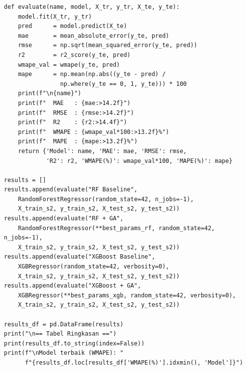 \begin{lstlisting}[style=pycode,caption={Fungsi evaluasi dan perbandingan 4 model}]
def evaluate(name, model, X_tr, y_tr, X_te, y_te):
    model.fit(X_tr, y_tr)
    pred      = model.predict(X_te)
    mae       = mean_absolute_error(y_te, pred)
    rmse      = np.sqrt(mean_squared_error(y_te, pred))
    r2        = r2_score(y_te, pred)
    wmape_val = wmape(y_te, pred)
    mape      = np.mean(np.abs((y_te - pred) /
                np.where(y_te == 0, 1, y_te))) * 100
    print(f"\n{name}")
    print(f"  MAE   : {mae:>14.2f}")
    print(f"  RMSE  : {rmse:>14.2f}")
    print(f"  R2    : {r2:>14.4f}")
    print(f"  WMAPE : {wmape_val*100:>13.2f}%")
    print(f"  MAPE  : {mape:>13.2f}%")
    return {'Model': name, 'MAE': mae, 'RMSE': rmse,
            'R2': r2, 'WMAPE(%)': wmape_val*100, 'MAPE(%)': mape}

results = []
results.append(evaluate("RF Baseline",
    RandomForestRegressor(random_state=42, n_jobs=-1),
    X_train_s2, y_train_s2, X_test_s2, y_test_s2))
results.append(evaluate("RF + GA",
    RandomForestRegressor(**best_params_rf, random_state=42, n_jobs=-1),
    X_train_s2, y_train_s2, X_test_s2, y_test_s2))
results.append(evaluate("XGBoost Baseline",
    XGBRegressor(random_state=42, verbosity=0),
    X_train_s2, y_train_s2, X_test_s2, y_test_s2))
results.append(evaluate("XGBoost + GA",
    XGBRegressor(**best_params_xgb, random_state=42, verbosity=0),
    X_train_s2, y_train_s2, X_test_s2, y_test_s2))

results_df = pd.DataFrame(results)
print("\n== Tabel Ringkasan ==")
print(results_df.to_string(index=False))
print(f"\nModel terbaik (WMAPE): "
      f"{results_df.loc[results_df['WMAPE(%)'].idxmin(), 'Model']}")
\end{lstlisting}

